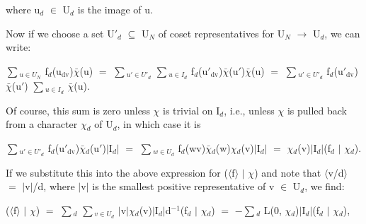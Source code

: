 \documentclass[10pt,twoside]{article}
\begin{document}
where u\ensuremath{_{d}} \ensuremath{∈} U\ensuremath{_{d}} is the image of u.\par
Now if we choose a set U\ensuremath{′}\ensuremath{_{d}} \ensuremath{⊆} U\ensuremath{_{N}} of coset representatives for U\ensuremath{_{N}} \ensuremath{→} U\ensuremath{_{d}}, we can write:\par
\ensuremath{∑}\ensuremath{_{u∈U_N}} f\ensuremath{_{d}}(u\ensuremath{_{\mathrm{dv}}})\ensuremath{\bar{χ}}(u) \ensuremath{=} \ensuremath{∑}\ensuremath{_{u′∈U′_d}} \ensuremath{∑}\ensuremath{_{u∈I_d}} f\ensuremath{_{d}}(u\ensuremath{′}\ensuremath{_{\mathrm{dv}}})\ensuremath{\bar{χ}}(u\ensuremath{′})\ensuremath{\bar{χ}}(u) \ensuremath{=} \ensuremath{∑}\ensuremath{_{u′∈U′_d}} f\ensuremath{_{d}}(u\ensuremath{′}\ensuremath{_{\mathrm{dv}}})\ensuremath{\bar{χ}}(u\ensuremath{′}) \ensuremath{∑}\ensuremath{_{u∈I_d}} \ensuremath{\bar{χ}}(u).\par
Of course, this sum is zero unless \ensuremath{χ} is trivial on I\ensuremath{_{d}}, i.e., unless \ensuremath{χ} is pulled back from a character \ensuremath{χ}\ensuremath{_{d}} of U\ensuremath{_{d}}, in which case it is\par
\ensuremath{∑}\ensuremath{_{u′∈U′_d}} f\ensuremath{_{d}}(u\ensuremath{′}\ensuremath{_{\mathrm{dv}}})\ensuremath{\bar{χ}}\ensuremath{_{d}}(u\ensuremath{′})\ensuremath{|}I\ensuremath{_{d}}\ensuremath{|} \ensuremath{=} \ensuremath{∑}\ensuremath{_{w∈U_d}} f\ensuremath{_{d}}(wv)\ensuremath{\bar{χ}}\ensuremath{_{d}}(w)\ensuremath{χ}\ensuremath{_{d}}(v)\ensuremath{|}I\ensuremath{_{d}}\ensuremath{|} \ensuremath{=} \ensuremath{χ}\ensuremath{_{d}}(v)\ensuremath{|}I\ensuremath{_{d}}\ensuremath{|}(f\ensuremath{_{d}} \ensuremath{|} \ensuremath{χ}\ensuremath{_{d}}).\par
If we substitute this into the above expression for (\ensuremath{⟨}f\ensuremath{⟩} \ensuremath{|} \ensuremath{χ}) and note that \ensuremath{⟨}v/d\ensuremath{⟩} \ensuremath{=} \ensuremath{|}v\ensuremath{|}/d, where \ensuremath{|}v\ensuremath{|} is the smallest positive representative of v \ensuremath{∈} U\ensuremath{_{d}}, we find:\par
(\ensuremath{⟨}f\ensuremath{⟩} \ensuremath{|} \ensuremath{χ}) \ensuremath{=} \ensuremath{∑}\ensuremath{_{d}} \ensuremath{∑}\ensuremath{_{v∈U_d}} \ensuremath{|}v\ensuremath{|}\ensuremath{χ}\ensuremath{_{d}}(v)\ensuremath{|}I\ensuremath{_{d}}\ensuremath{|}d\ensuremath{^{-1}}(f\ensuremath{_{d}} \ensuremath{|} \ensuremath{χ}\ensuremath{_{d}}) \ensuremath{=} \ensuremath{−}\ensuremath{∑}\ensuremath{_{d}} L(0, \ensuremath{χ}\ensuremath{_{d}})\ensuremath{|}I\ensuremath{_{d}}\ensuremath{|}(f\ensuremath{_{d}} \ensuremath{|} \ensuremath{χ}\ensuremath{_{d}}),\par
\end{document}
